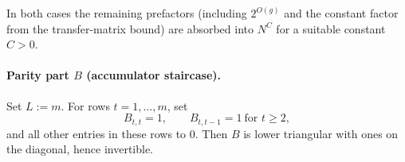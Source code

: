 In both cases the remaining prefactors (including $2^{O(g)}$ and the constant factor from the transfer-matrix bound)
are absorbed into $N^{C}$ for a suitable constant $C>0$.




\paragraph{Parity part $B$ (accumulator staircase).}
Set $L:=m$.
For rows $t=1,\dots,m$, set
\begin{equation}
B_{t,t}=1,
\qquad
B_{t,t-1}=1\ \text{for } t\ge 2,
\label{eq:B-acc}
\end{equation}
and all other entries in these rows to $0$.
Then $B$ is lower triangular with ones on the diagonal, hence invertible.




